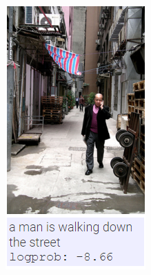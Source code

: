 \begin{figure}
\begin{subfigure}{.5\textwidth}
				\label{fig:perfectresults6}
			\end{subfigure}
			\\
			\begin{subfigure}{.5\textwidth}
				\centering
				\includegraphics[width=.8\linewidth]{Images/Results/Perfect/walking_down_the_street}
				\label{fig:perfectresults7}
			\end{subfigure}%
			\begin{subfigure}{.5\textwidth}
				\centering

\end{subfigure}
\end{figure}

